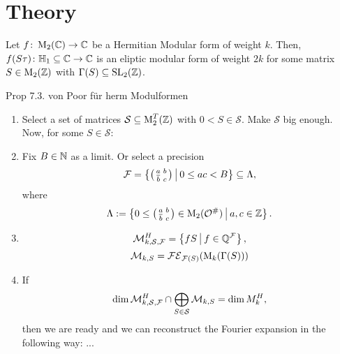 
\section{Theory}


\begin{lemma}
Let $f \colon \operatorname{M}_2(\mathbb{C}) \rightarrow \mathbb{C}$ be a Hermitian Modular form of weight $k$.
Then, $f(S \tau) \colon \mathbb{H}_1 \subseteq \mathbb{C} \rightarrow \mathbb{C}$ is an eliptic modular form of weight $2k$ for some matrix $S \in \operatorname{M}_2(\mathbb{Z})$ with $\Gamma(S) \subseteq \operatorname{SL}_2(\mathbb{Z})$.
\end{lemma}


\begin{lemma}
Prop 7.3. von Poor für herm Modulformen
\end{lemma}

\begin{algo}
\begin{enumerate}
\item Select a set of matrices $\mathcal{S} \subseteq \operatorname{M}_2^T(\mathbb{Z})$ with $0 < S \in \mathcal{S}$. Make $\mathcal{S}$ big enough. Now, for some $S \in \mathcal{S}$:

\item Fix $B \in \mathbb{N}$ as a limit. Or select a precision
\[ \F = \Set{\SmallMatrix{a}{b}{\overline b}{c}}{0 \le a c < B} \subseteq \Lambda , \]
where
\[ \Lambda := \Set{0 \le \SmallMatrix{a}{b}{\overline b}{c} \in \M_2(\curlO^\#)}{a,c \in \Z } . \]

\item \[ \mathcal{M}_{k,\mathcal{S},\F}^H = \Set{f S}{f \in \Q^\F} , \]
\[ \mathcal{M}_{k,S} = \mathcal{FE}_{\mathcal{F}(S)}(\operatorname{M}_k(\Gamma(S))) \]

\item If
\[ \dim \mathcal{M}_{k,\mathcal{S},\mathcal{F}}^H \cap \bigoplus_{S \in \mathcal{S}} \mathcal{M}_{k,S}
= \dim M^H_k , \]
then we are ready and we can reconstruct the Fourier expansion in the following way: ...

\end{enumerate}
\end{algo}

